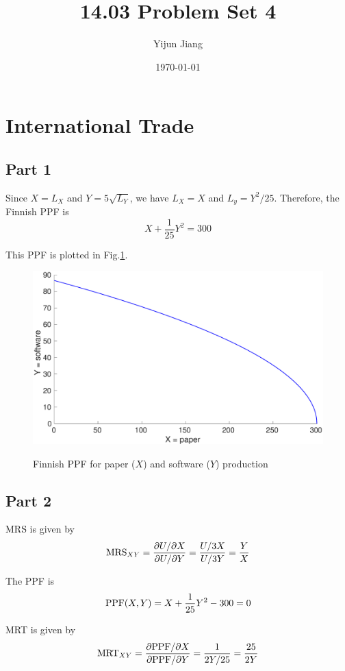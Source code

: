 \documentclass{article}
\title{14.03 Problem Set 4}
\author{Yijun Jiang}
\date{\today}
\begin{document}
\maketitle

\section{International Trade}
\subsection{Part 1}
Since $X=L_X$ and $Y=5\sqrt{L_Y}$, we have $L_X=X$ and $L_y=Y^2/25$. Therefore, the Finnish PPF is
\begin{equation*}
X+\frac{1}{25}Y^2=300
\end{equation*}

This PPF is plotted in Fig.\ref{PPF}.
\begin{figure}[!htbp]
\centering
\includegraphics[width=12cm]{PPF.eps}\\
\caption{Finnish PPF for paper ($X$) and software ($Y$) production}\label{PPF}
\end{figure}

\subsection{Part 2}
MRS is given by
\begin{equation*}
\textup{MRS}_{XY}=\frac{\partial U/\partial X}{\partial U/\partial Y}=\frac{U/3X}{U/3Y}=\frac{Y}{X}
\end{equation*}

The PPF is
\begin{equation*}
\textup{PPF}(X,Y)=X+\frac{1}{25}Y^2-300=0
\end{equation*}

MRT is given by
\begin{equation*}
\textup{MRT}_{XY}=\frac{\partial\textup{PPF}/\partial X}{\partial\textup{PPF}/\partial Y}=\frac{1}{2Y/25}=\frac{25}{2Y}
\end{equation*}
\end{document}
